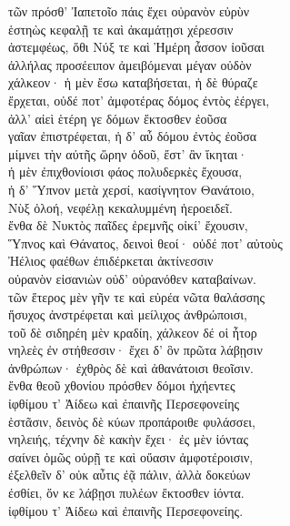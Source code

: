 \begin{pages}
\begin{Leftside}
\quad{}τῶν πρόσθ' Ἰαπετοῖο πάις ἔχει οὐρανὸν εὐρὺν\\
ἑστηὼς κεφαλῇ τε καὶ ἀκαμάτῃσι χέρεσσιν\\
ἀστεμφέως, ὅθι Νύξ τε καὶ Ἡμέρη ἆσσον ἰοῦσαι\\
ἀλλήλας προσέειπον ἀμειβόμεναι μέγαν οὐδὸν \\
χάλκεον· ἡ μὲν ἔσω καταβήσεται, ἡ δὲ θύραζε  \\
ἔρχεται, οὐδέ ποτ' ἀμφοτέρας δόμος ἐντὸς ἐέργει,\\
ἀλλ' αἰεὶ ἑτέρη γε δόμων ἔκτοσθεν ἐοῦσα\\
γαῖαν ἐπιστρέφεται, ἡ δ' αὖ δόμου ἐντὸς ἐοῦσα \\
μίμνει τὴν αὐτῆς ὥρην ὁδοῦ, ἔστ' ἂν ἵκηται· \\
ἡ μὲν ἐπιχθονίοισι φάος πολυδερκὲς ἔχουσα,  \\
ἡ δ' Ὕπνον μετὰ χερσί, κασίγνητον Θανάτοιο, \\
Νὺξ ὀλοή, νεφέλῃ κεκαλυμμένη ἠεροειδεῖ.\\

\quad{}ἔνθα δὲ Νυκτὸς παῖδες ἐρεμνῆς οἰκί' ἔχουσιν,\\
Ὕπνος καὶ Θάνατος, δεινοὶ θεοί· οὐδέ ποτ' αὐτοὺς \\
Ἠέλιος φαέθων ἐπιδέρκεται ἀκτίνεσσιν \\
οὐρανὸν εἰσανιὼν οὐδ' οὐρανόθεν καταβαίνων. \\
τῶν ἕτερος μὲν γῆν τε καὶ εὐρέα νῶτα θαλάσσης \\
ἥσυχος ἀνστρέφεται καὶ μείλιχος ἀνθρώποισι,\\
τοῦ δὲ σιδηρέη μὲν κραδίη, χάλκεον δέ οἱ ἦτορ\\
νηλεὲς ἐν στήθεσσιν· ἔχει δ' ὃν πρῶτα λάβῃσιν  \\
ἀνθρώπων· ἐχθρὸς δὲ καὶ ἀθανάτοισι θεοῖσιν. \\

\quad{}ἔνθα θεοῦ χθονίου πρόσθεν δόμοι ἠχήεντες\\
ἰφθίμου τ' Ἀίδεω καὶ ἐπαινῆς Περσεφονείης\\
ἑστᾶσιν, δεινὸς δὲ κύων προπάροιθε φυλάσσει, \\
νηλειής, τέχνην δὲ κακὴν ἔχει· ἐς μὲν ἰόντας  \\
σαίνει ὁμῶς οὐρῇ τε καὶ οὔασιν ἀμφοτέροισιν,\\
ἐξελθεῖν δ' οὐκ αὖτις ἐᾷ πάλιν, ἀλλὰ δοκεύων\\
ἐσθίει, ὅν κε λάβῃσι πυλέων ἔκτοσθεν ἰόντα.\\
ἰφθίμου τ' Ἀίδεω καὶ ἐπαινῆς Περσεφονείης.\\


\end{Leftside}
\end{pages}
